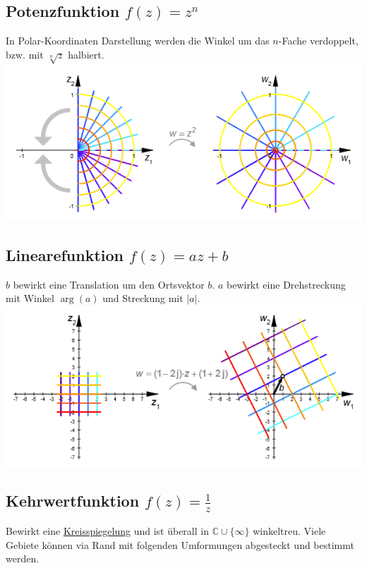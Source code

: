 \subsection{Potenzfunktion $f(z) = z^n$}
In Polar-Koordinaten Darstellung werden die Winkel um das $n$-Fache verdoppelt, bzw. mit $\sqrt[n]{z}$ halbiert.
\includegraphics[width=\columnwidth]{Images/quadrat_funktion}

\subsection{Linearefunktion $f(z) = az + b$}
$b$ bewirkt eine Translation um den Ortsvektor $b$. $a$ bewirkt eine Drehstreckung mit Winkel $\arg(a)$ und Streckung mit $|a|$.
\includegraphics[width=\columnwidth]{Images/lineare_funktion}


\subsection{Kehrwertfunktion $f(z) = \frac{1}{z}$}
Bewirkt eine \underline{Kreisspiegelung} und ist überall in $\mathbb{C}\cup\{\infty\}$ winkeltreu. Viele Gebiete können via Rand mit folgenden Umformungen abgesteckt und bestimmt werden.

